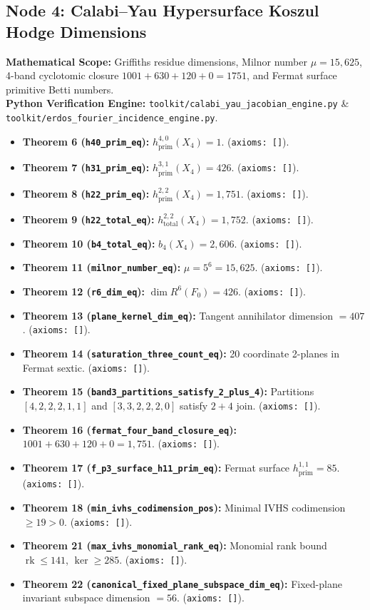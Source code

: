 \documentclass[11pt,a4paper]{article}
\DeclareMathOperator{\rk}{rk}
\begin{document}
\subsection{Node 4: Calabi--Yau Hypersurface Koszul Hodge Dimensions}
\textbf{Mathematical Scope:} Griffiths residue dimensions, Milnor number $\mu = 15,625$, 4-band cyclotomic closure $1001+630+120+0=1751$, and Fermat surface primitive Betti numbers.\\
\textbf{Python Verification Engine:} \texttt{toolkit/calabi\_yau\_jacobian\_engine.py} \& \texttt{toolkit/erdos\_fourier\_incidence\_engine.py}.
\begin{itemize}[leftmargin=1.5em]
\item \textbf{Theorem 6 (\texttt{h40\_prim\_eq}):} $h^{4,0}_{\mathrm{prim}}(X_4) = 1$. (\texttt{axioms: []}).
\item \textbf{Theorem 7 (\texttt{h31\_prim\_eq}):} $h^{3,1}_{\mathrm{prim}}(X_4) = 426$. (\texttt{axioms: []}).
\item \textbf{Theorem 8 (\texttt{h22\_prim\_eq}):} $h^{2,2}_{\mathrm{prim}}(X_4) = 1,751$. (\texttt{axioms: []}).
\item \textbf{Theorem 9 (\texttt{h22\_total\_eq}):} $h^{2,2}_{\mathrm{total}}(X_4) = 1,752$. (\texttt{axioms: []}).
\item \textbf{Theorem 10 (\texttt{b4\_total\_eq}):} $b_4(X_4) = 2,606$. (\texttt{axioms: []}).
\item \textbf{Theorem 11 (\texttt{milnor\_number\_eq}):} $\mu = 5^6 = 15,625$. (\texttt{axioms: []}).
\item \textbf{Theorem 12 (\texttt{r6\_dim\_eq}):} $\dim R^6(F_0) = 426$. (\texttt{axioms: []}).
\item \textbf{Theorem 13 (\texttt{plane\_kernel\_dim\_eq}):} Tangent annihilator dimension $= 407$. (\texttt{axioms: []}).
\item \textbf{Theorem 14 (\texttt{saturation\_three\_count\_eq}):} 20 coordinate 2-planes in Fermat sextic. (\texttt{axioms: []}).
\item \textbf{Theorem 15 (\texttt{band3\_partitions\_satisfy\_2\_plus\_4}):} Partitions $[4,2,2,2,1,1]$ and $[3,3,2,2,2,0]$ satisfy $2+4$ join. (\texttt{axioms: []}).
\item \textbf{Theorem 16 (\texttt{fermat\_four\_band\_closure\_eq}):} $1001 + 630 + 120 + 0 = 1,751$. (\texttt{axioms: []}).
\item \textbf{Theorem 17 (\texttt{f\_p3\_surface\_h11\_prim\_eq}):} Fermat surface $h^{1,1}_{\mathrm{prim}} = 85$. (\texttt{axioms: []}).
\item \textbf{Theorem 18 (\texttt{min\_ivhs\_codimension\_pos}):} Minimal IVHS codimension $\ge 19 > 0$. (\texttt{axioms: []}).
\item \textbf{Theorem 21 (\texttt{max\_ivhs\_monomial\_rank\_eq}):} Monomial rank bound $\rk \le 141$, $\ker \ge 285$. (\texttt{axioms: []}).
\item \textbf{Theorem 22 (\texttt{canonical\_fixed\_plane\_subspace\_dim\_eq}):} Fixed-plane invariant subspace dimension $= 56$. (\texttt{axioms: []}).
\end{itemize}
\end{document}
